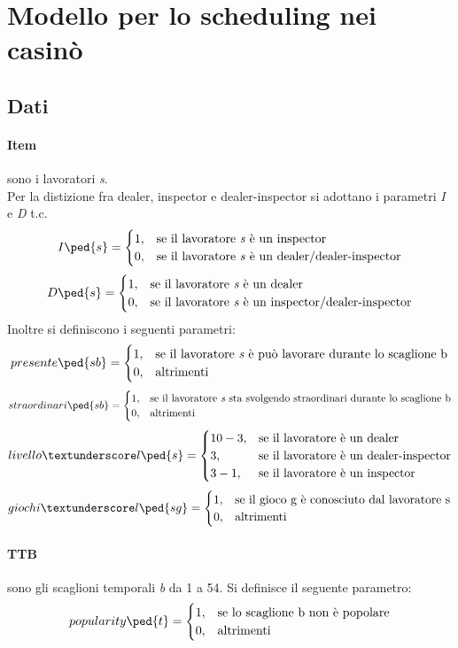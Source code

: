 \section{Modello per lo scheduling nei casinò}
\subsection{Dati}
\paragraph{Item} sono i lavoratori \textit{s}. \\Per la distizione fra dealer, inspector e dealer-inspector si adottano i parametri \textit{I} e \textit{D} t.c.
\[
I\ped{s} = \begin{cases}
1,& \text{se il lavoratore\ \textit{s} è un inspector}  \\
0,& \text{se il lavoratore\ \textit{s} è un dealer/dealer-inspector}
\end{cases}
\]
\[
D\ped{s} = \begin{cases}
1,& \text{se il lavoratore\ \textit{s} è un dealer}  \\
0,& \text{se il lavoratore\ \textit{s} è un inspector/dealer-inspector}
\end{cases}
\]
Inoltre si definiscono i seguenti parametri:
\[
presente\ped{sb} = \begin{cases}
1,& \text{se il lavoratore\ \textit{s} è può lavorare durante lo scaglione b}  \\
0,& \text{altrimenti}
\end{cases}
\]
\[
straordinari\ped{sb} = \begin{cases}
1,& \text{se il lavoratore\ \textit{s} sta svolgendo straordinari durante lo scaglione b}  \\
0,& \text{altrimenti}
\end{cases}
\]
\[
livello\textunderscore l\ped{s} = \begin{cases}
10-3,& \text{se il lavoratore è un dealer}  \\
3,& \text{se il lavoratore è un dealer-inspector} \\
3-1,& \text{se il lavoratore è un inspector} 
\end{cases}
\]
\[
giochi\textunderscore l\ped{sg} = \begin{cases}
1,& \text{se il gioco g è conosciuto dal lavoratore s}  \\
0,& \text{altrimenti}
\end{cases}
\]
\paragraph{TTB} sono gli scaglioni temporali \textit{b} da 1 a 54. Si definisce il seguente parametro:
\[
popularity\ped{t} = \begin{cases}
1,& \text{se lo scaglione b non è popolare}  \\
0,& \text{altrimenti}
\end{cases}
\]
